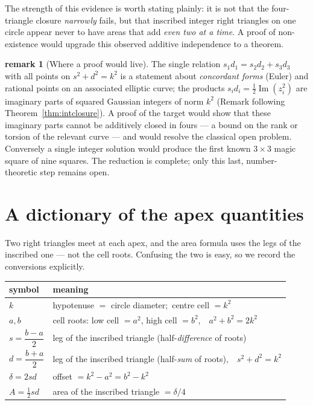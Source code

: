 \documentclass[11pt]{article}
\theoremstyle{definition}
\newtheorem{remark}{remark}
\begin{document}
\noindent The strength of this evidence is worth stating plainly: it is not that
the four-triangle closure \emph{narrowly} fails, but that inscribed integer right
triangles on one circle appear never to have areas that add \emph{even two at a
time}. A proof of non-existence would upgrade this observed additive independence
to a theorem.

\begin{remark}[Where a proof would live]
The single relation $s_1d_1=s_2d_2+s_3d_3$ with all points on $s^{2}+d^{2}=k^{2}$
is a statement about \emph{concordant forms} (Euler) and rational points on an
associated elliptic curve; the products $s_id_i=\tfrac12\operatorname{Im}(z_i^{2})$
are imaginary parts of squared Gaussian integers of norm $k^{2}$
(Remark following Theorem~\ref{thm:intclosure}). A proof of the target would show
that these imaginary parts cannot be additively closed in fours --- a bound on the
rank or torsion of the relevant curve --- and would resolve the classical open
problem. Conversely a single integer solution would produce the first known
$3\times3$ magic square of nine squares. The reduction is complete; only this last,
number-theoretic step remains open.
\end{remark}

\section{A dictionary of the apex quantities}

Two right triangles meet at each apex, and the area formula uses the legs of the
inscribed one --- not the cell roots. Confusing the two is easy, so we record the
conversions explicitly.

\begin{center}
\renewcommand{\arraystretch}{1.25}
\begin{tabular}{ll}
\hline
symbol & meaning\\
\hline
$k$ & hypotenuse $=$ circle diameter;\ centre cell $=k^{2}$\\
$a,b$ & cell roots: low cell $=a^{2}$, high cell $=b^{2}$,\ \ $a^{2}+b^{2}=2k^{2}$\\
$s=\dfrac{b-a}{2}$ & leg of the inscribed triangle (half-\emph{difference} of roots)\\
$d=\dfrac{b+a}{2}$ & leg of the inscribed triangle (half-\emph{sum} of roots),\ \ $s^{2}+d^{2}=k^{2}$\\
$\delta=2sd$ & offset $=k^{2}-a^{2}=b^{2}-k^{2}$\\
$A=\tfrac12 sd$ & area of the inscribed triangle $=\delta/4$\\
\hline
\end{tabular}
\end{center}
\end{document}
